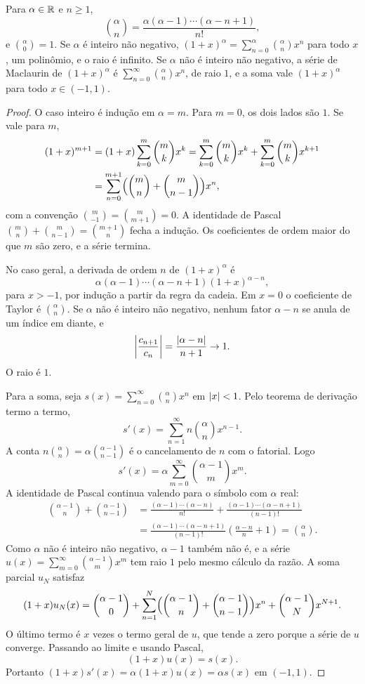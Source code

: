 \documentclass[11pt,a4paper]{article}
\begin{document}
\begin{teorema}[binomial]
Para \(\alpha\in\mathbb{R}\) e \(n\ge 1\),
\[
\binom{\alpha}{n}=\frac{\alpha(\alpha-1)\cdots(\alpha-n+1)}{n!},
\]
e \(\binom{\alpha}{0}=1\). Se \(\alpha\) é inteiro não negativo, \((1+x)^\alpha=\sum_{n=0}^{\alpha}\binom{\alpha}{n}x^n\) para todo \(x\), um polinômio, e o raio é infinito. Se \(\alpha\) não é inteiro não negativo, a série de Maclaurin de \((1+x)^\alpha\) é \(\sum_{n=0}^\infty\binom{\alpha}{n}x^n\), de raio \(1\), e a soma vale \((1+x)^\alpha\) para todo \(x\in(-1,1)\).
\end{teorema}

\begin{proof}
O caso inteiro é indução em \(\alpha=m\). Para \(m=0\), os dois lados são \(1\). Se vale para \(m\),
\begin{align*}
(1+x)^{m+1}
&=(1+x)\sum_{k=0}^m\binom{m}{k}x^k
=\sum_{k=0}^m\binom{m}{k}x^k+\sum_{k=0}^m\binom{m}{k}x^{k+1}\\
&=\sum_{n=0}^{m+1}\Bigl(\binom{m}{n}+\binom{m}{n-1}\Bigr)x^n,
\end{align*}
com a convenção \(\binom{m}{-1}=\binom{m}{m+1}=0\). A identidade de Pascal \(\binom{m}{n}+\binom{m}{n-1}=\binom{m+1}{n}\) fecha a indução. Os coeficientes de ordem maior do que \(m\) são zero, e a série termina.

No caso geral, a derivada de ordem \(n\) de \((1+x)^\alpha\) é
\[
\alpha(\alpha-1)\cdots(\alpha-n+1)(1+x)^{\alpha-n},
\]
para \(x>-1\), por indução a partir da regra da cadeia. Em \(x=0\) o coeficiente de Taylor é \(\binom{\alpha}{n}\). Se \(\alpha\) não é inteiro não negativo, nenhum fator \(\alpha-n\) se anula de um índice em diante, e
\[
\left\lvert \frac{c_{n+1}}{c_n} \right\rvert=\frac{\left\lvert \alpha-n \right\rvert}{n+1}\to 1.
\]
O raio é \(1\).

Para a soma, seja \(s(x)=\sum_{n=0}^\infty\binom{\alpha}{n}x^n\) em \(\left\lvert x \right\rvert<1\). Pelo teorema de derivação termo a termo,
\[
s'(x)=\sum_{n=1}^\infty n\binom{\alpha}{n}x^{n-1}.
\]
A conta \(n\binom{\alpha}{n}=\alpha\binom{\alpha-1}{n-1}\) é o cancelamento de \(n\) com o fatorial. Logo
\[
s'(x)=\alpha\sum_{m=0}^\infty\binom{\alpha-1}{m}x^m.
\]
A identidade de Pascal continua valendo para o símbolo com \(\alpha\) real:
\begin{align*}
\binom{\alpha-1}{n}+\binom{\alpha-1}{n-1}
&=\frac{(\alpha-1)\cdots(\alpha-n)}{n!}+\frac{(\alpha-1)\cdots(\alpha-n+1)}{(n-1)!}\\
&=\frac{(\alpha-1)\cdots(\alpha-n+1)}{(n-1)!}\left(\frac{\alpha-n}{n}+1\right)
=\binom{\alpha}{n}.
\end{align*}
Como \(\alpha\) não é inteiro não negativo, \(\alpha-1\) também não é, e a série \(u(x)=\sum_{m=0}^\infty\binom{\alpha-1}{m}x^m\) tem raio \(1\) pelo mesmo cálculo da razão. A soma parcial \(u_N\) satisfaz
\[
(1+x)u_N(x)
=\binom{\alpha-1}{0}+\sum_{n=1}^N\Bigl(\binom{\alpha-1}{n}+\binom{\alpha-1}{n-1}\Bigr)x^n+\binom{\alpha-1}{N}x^{N+1}.
\]
O último termo é \(x\) vezes o termo geral de \(u\), que tende a zero porque a série de \(u\) converge. Passando ao limite e usando Pascal,
\[
(1+x)u(x)=s(x).
\]
Portanto \((1+x)s'(x)=\alpha(1+x)u(x)=\alpha s(x)\) em \((-1,1)\).


\end{proof}
\end{document}
